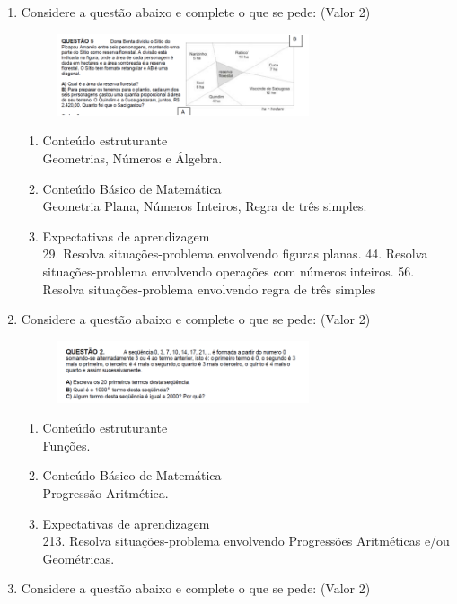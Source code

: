 \documentclass[a4paper, 12pt]{article}
\begin{document}
\begin{enumerate}
\item Considere a questão abaixo e complete o que se pede: (Valor 2)
\begin{figure}[h!]
  \centering
  \includegraphics[width=0.7\textwidth]{1}
\end{figure} 
  \begin{enumerate}
  \item Conteúdo estruturante \\
    Geometrias, Números e Álgebra.
  \item Conteúdo Básico de Matemática\\
    Geometria Plana, Números Inteiros, Regra de três simples.
  \item Expectativas de aprendizagem\\
    29. Resolva situações-problema envolvendo figuras planas. 44. Resolva situações-problema envolvendo operações com números inteiros. 56. Resolva situações-problema envolvendo regra de três simples
  \end{enumerate}
\item Considere a questão abaixo e complete o que se pede: (Valor 2)
\begin{figure}[h!]
  \centering
  \includegraphics[width=0.7\textwidth]{2}
\end{figure} 
  \begin{enumerate}
  \item Conteúdo estruturante\\
    Funções.    
  \item Conteúdo Básico de Matemática\\
    Progressão Aritmética.
  \item Expectativas de aprendizagem\\
    213. Resolva situações-problema envolvendo Progressões Aritméticas e/ou Geométricas.
  \end{enumerate}
\item Considere a questão abaixo e complete o que se pede: (Valor 2)

\end{enumerate}
\end{document}
